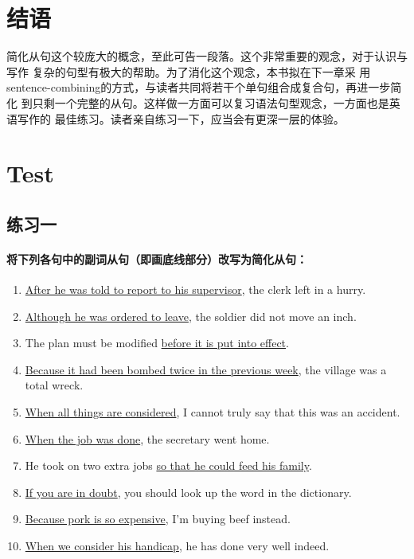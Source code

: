 \section{结语}

简化从句这个较庞大的概念，至此可告一段落。这个非常重要的观念，对于认识与写作
复杂的句型有极大的帮助。为了消化这个观念，本书拟在下一章采
用sentence-combining的方式，与读者共同将若干个单句组合成复合句，再进一步简化
到只剩一个完整的从句。这样做一方面可以复习语法句型观念，一方面也是英语写作的
最佳练习。读者亲自练习一下，应当会有更深一层的体验。

\section{Test}

\subsection{练习一}

\paragraph{将下列各句中的副词从句（即画底线部分）改写为简化从句：}

\begin{enumerate}
\item \ul{After he was told to report to his supervisor}, the clerk left in a
hurry.

\item \ul{Although he was ordered to leave}, the soldier did not move an inch.

\item The plan must be modified \ul{before it is put into effect}.

\item \ul{Because it had been bombed twice in the previous week}, the village
was a total wreck.

\item \ul{When all things are considered}, I cannot truly say that this was an
accident.

\item \ul{When the job was done}, the secretary went home.

\item He took on two extra jobs \ul{so that he could feed his family}.

\item \ul{If you are in doubt}, you should look up the word in the dictionary.

\item \ul{Because pork is so expensive}, I'm buying beef instead.

\item \ul{ When we consider his handicap}, he has done very well indeed.
\end{enumerate}

